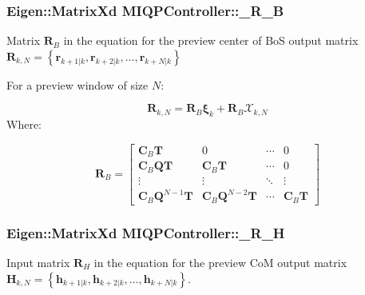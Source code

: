 \hypertarget{classMIQPController_a69fbc25a2e2f2392fe0f92c5811c12dd}{
\subsubsection[{\-\_\-\-R\-\_\-\-B}]{\setlength{\rightskip}{0pt plus 5cm}\-Eigen\-::\-Matrix\-Xd {\bf \-M\-I\-Q\-P\-Controller\-::\-\_\-\-R\-\_\-\-B}}}\label{classMIQPController_a69fbc25a2e2f2392fe0f92c5811c12dd}
\-Matrix $\mathbf{R}_B$ in the equation for the preview center of \-Bo\-S output matrix $\mathbf{R}_{k,N} = \left\{ \mathbf{r}_{k+1|k}, \mathbf{r}_{k+2|k}, \dots, \mathbf{r}_{k+N|k} \right\}$

\-For a preview window of size $N$\-:

\[ \mathbf{R}_{k,N} = \mathbf{R}_B \mathbf{\xi}_k + \mathbf{R}_B \mathcal{X}_{k,N} \] \-Where\-:

\[ \mathbf{R}_B = \left[\begin{array}{cccc} \mathbf{C}_B\mathbf{T} & 0 & \cdots & 0 \\ \mathbf{C}_B\mathbf{Q}\mathbf{T} & \mathbf{C}_B\mathbf{T} & \cdots & 0 \\ \vdots & \vdots & \ddots & \vdots \\ \mathbf{C}_B\mathbf{Q}^{N-1}\mathbf{T} & \mathbf{C}_B\mathbf{Q}^{N-2}\mathbf{T} & \cdots & \mathbf{C}_B\mathbf{T} \end{array}\right] \] \hypertarget{classMIQPController_a2207c17eb221166b1bc12fbca976035d}{
\subsubsection[{\-\_\-\-R\-\_\-\-H}]{\setlength{\rightskip}{0pt plus 5cm}\-Eigen\-::\-Matrix\-Xd {\bf \-M\-I\-Q\-P\-Controller\-::\-\_\-\-R\-\_\-\-H}}}\label{classMIQPController_a2207c17eb221166b1bc12fbca976035d}
\-Input matrix $\mathbf{R}_H$ in the equation for the preview \-Co\-M output matrix $\mathbf{H}_{k,N} = \left\{ \mathbf{h}_{k+1|k}, \mathbf{h}_{k+2|k}, \dots, \mathbf{h}_{k+N|k} \right\}$.

